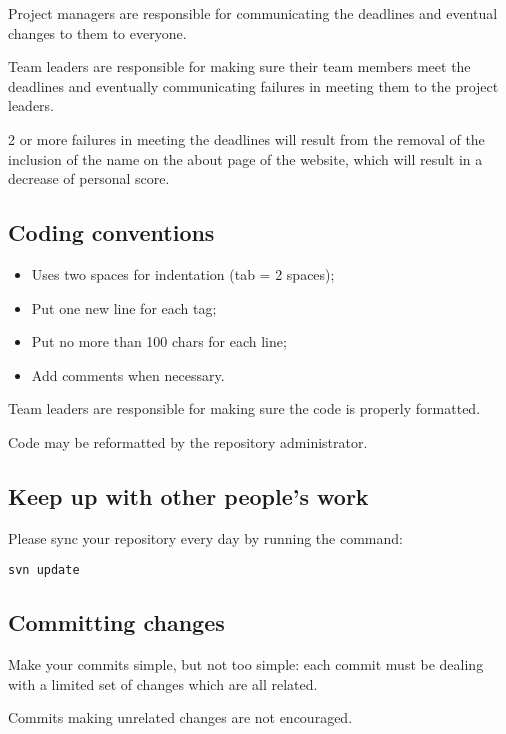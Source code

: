 \documentclass[hidelinks,12pt,a4paper,numbers=enddot]{scrartcl}
\begin{document}
Project managers are responsible for communicating the deadlines
and eventual changes to them to everyone.

Team leaders are responsible for making sure their team members
meet the deadlines and eventually communicating failures in meeting
them to the project leaders.

2 or more failures in meeting the deadlines will result from the removal
of the inclusion of the name on the about page of the website, which
will result in a decrease of personal score.

\subsection{Coding conventions}\label{coding-conventions}

\begin{itemize}
\item
  Uses two spaces for indentation (tab = 2 spaces);
\item
  Put one new line for each tag;
\item
  Put no more than 100 chars for each line;
\item
  Add comments when necessary.
\end{itemize}

Team leaders are responsible for making sure the code is properly
formatted.

Code may be reformatted by the repository administrator.

\subsection{Keep up with other people's work}\label{keep-up-with-other-peoples-work}

Please sync your repository every day by running the command:

\begin{verbatim}
svn update
\end{verbatim}

\subsection{Committing changes}\label{committing-changes}

Make your commits simple, but not too simple: each commit must be
dealing with a limited set of changes which are all related.

Commits making unrelated changes are not encouraged.
\end{document}
